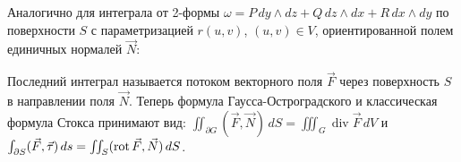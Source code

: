 \vspace{5pt}
Аналогично для интеграла от 2-формы $\omega = P\, dy \wedge dz + Q\, dz \wedge dx + R\, dx \wedge dy$ по поверхности $S$ с параметризацией $r(u, v)$, $(u, v) \in V$, ориентированной полем единичных нормалей $\vec{N}$:


\vspace{10pt}

\noindent{}
\vspace{10pt}

\noindent Последний интеграл называется потоком векторного поля $\vec{F}$ через поверхность $S$ в направлении поля $\vec{N}$. Теперь формула Гаусса-Остроградского и классическая формула Стокса принимают вид: $\iint_{\partial G} (\vec{F}, \vec{N})\, dS = \iiint_G \operatorname{div} \vec{F}\, dV$ и $\int_{\partial S} (\vec{F}, \vec{\tau}) \, ds = \iint_S (\operatorname{rot} \vec{F}, \vec{N})\, dS$.

